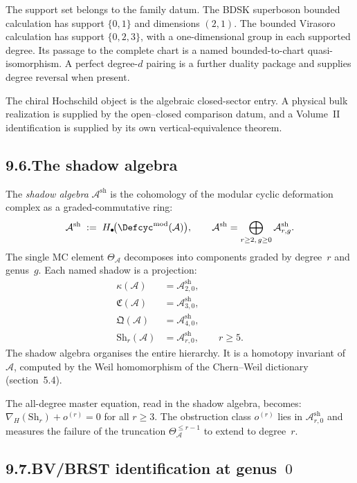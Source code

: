 \documentclass[11pt]{report}
\theoremstyle{definition}
\theoremstyle{remark}
\providecommand{\cA}{\mathcal{A}}
\numberwithin{equation}{section}
\begin{document}
The support set belongs to the family datum.  The BDSK superboson
bounded calculation has support \(\{0,1\}\) and dimensions \((2,1)\).
The bounded Virasoro calculation has support \(\{0,2,3\}\), with a
one-dimensional group in each supported degree.  Its passage to the
complete chart is a named bounded-to-chart quasi-isomorphism.  A
perfect degree-\(d\) pairing is a further duality package and supplies
degree reversal when present.

The chiral Hochschild object is the algebraic closed-sector entry.
A physical bulk realization is supplied by the open--closed
comparison datum, and a Volume~II identification is supplied by its
own vertical-equivalence theorem.


\subsection*{9.6.\quad The shadow algebra}

The \emph{shadow algebra} $\cA^{\mathrm{sh}}$ is the cohomology of
the modular cyclic deformation complex as a graded-commutative ring:
\[
\cA^{\mathrm{sh}}
\;:=\;
H_\bullet\!\bigl(\Defcyc^{\mathrm{mod}}(\cA)\bigr),
\qquad
\cA^{\mathrm{sh}}=\bigoplus_{r\ge 2,\,g\ge 0}
\cA^{\mathrm{sh}}_{r,g}.
\]
The single MC element $\Theta_\cA$ decomposes into components
graded by degree~$r$ and genus~$g$. Each named shadow is a
projection:
\begin{align*}
\kappa(\cA) &= \cA^{\mathrm{sh}}_{2,0},\\
\mathfrak C(\cA) &= \cA^{\mathrm{sh}}_{3,0},\\
\mathfrak Q(\cA) &= \cA^{\mathrm{sh}}_{4,0},\\
\mathrm{Sh}_r(\cA) &= \cA^{\mathrm{sh}}_{r,0},\qquad r\ge 5.
\end{align*}
The shadow algebra organises the entire hierarchy. It is a
homotopy invariant of~$\cA$, computed by the Weil homomorphism of
the Chern--Weil dictionary (section~5.4).

The all-degree master equation, read in the shadow algebra, becomes:
$\nabla_H(\mathrm{Sh}_r)+o^{(r)}=0$ for all $r\ge 3$. The
obstruction class $o^{(r)}$ lies in $\cA^{\mathrm{sh}}_{r,0}$ and
measures the failure of the truncation $\Theta^{\le r-1}_\cA$ to
extend to degree~$r$.


\subsection*{9.7.\quad BV/BRST identification at genus~$0$}
\end{document}
